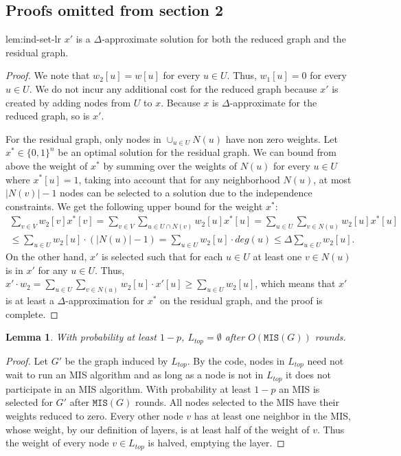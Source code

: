 \documentclass[11pt]{article}
\newtheorem{lemma}[theorem]{Lemma}
\newenvironment{lemma-repeat}[1]{\begin{trivlist}
\item[\hspace{\labelsep}{\bf\noindent Lemma \ref{#1} }]\em }%
{\end{trivlist}}
\newcommand{\Ltop}{L_{top}}
\newcommand{\MIS}{\texttt{MIS}(G)}
\begin{document}
\subsection{Proofs omitted from section 2}
\begin{lemma-repeat}{lem:ind-set-lr}
	$x'$ is a $\Delta$-approximate solution for both the reduced graph and the residual graph.
\end{lemma-repeat}
\begin{proof}
	We note that $w_2[u]=w[u]$ for every $u \in U$. Thus, $w_1[u]=0$ for every $u \in U$. We do not incur any additional cost for the reduced graph because $x'$ is created by adding nodes from $U$ to $x$. Because  $x$ is $\Delta$-approximate for the reduced graph, so is $x'$.
	
	For the residual graph, only nodes in $\cup_{u \in U} N(u)$ have non zero weights.
	Let $x^*\in \{0,1\}^n$ be an optimal solution for the residual graph. We can bound from above the weight of $x^*$ by summing over the weights of $N(u)$ for every $u\in U$ where $x^*[u]=1$, taking into account that for any neighborhood $N(u)$, at most $|N(v)|-1$ nodes can be selected to a solution due to the independence constraints. We get the following upper bound for the weight $x^*$:
	\begin{align*}
		\sum_{v\in V} w_2[v]x^*[v] = \sum_{v\in V} \sum_{u\in U\cap N(v)} w_2[u]x^*[u] = \sum_{u\in U}\sum_{v \in N(u)} w_2[u]x^*[u]\\ \leq \sum_{u\in U} w_2[u]\cdot (|N(u)|-1) = \sum_{u\in U} w_2[u]\cdot deg(u) \leq \Delta\sum_{u\in U} w_2[u].
	\end{align*}
	On the other hand, $x'$ is selected such that for each $u\in U$ at least one $v \in N(u)$ is in $x'$ for any $u \in U$. Thus, $x'\cdot w_2 = \sum_{u\in U}\sum_{v \in N(u)} w_2[u]\cdot x'[u] \geq \sum_{u\in U} w_2[u]$, which means that $x'$ is at least a $\Delta$-approximation for $x^*$ on the residual graph, and the proof is complete.
\end{proof}
\begin{lemma}
	\label{lem:dist-mis-correctness}
	With probability at least $1-p$, $\Ltop = \emptyset$ after $O(\MIS)$ rounds.
\end{lemma}
\begin{proof}
	Let $G'$ be the graph induced by $\Ltop$. By the code, nodes in $\Ltop$ need not wait to run an MIS algorithm and as long as a node is not in $\Ltop$ it does not participate in an MIS algorithm. With probability at least $1-p$ an MIS is selected for $G'$ after $\MIS$ rounds.
	All nodes selected to the MIS have their weights reduced to zero. Every other node $v$ has at least one neighbor in the MIS, whose weight, by our definition of layers, is at least half of the weight of $v$. Thus the weight of every node $v\in \Ltop$ is halved, emptying the layer.
\end{proof}
\end{document}

